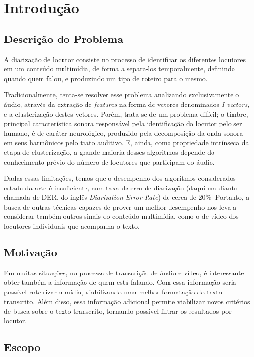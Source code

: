 \chapter{Introdução}

\section{Descrição do Problema}

A diarização de locutor consiste no processo de identificar os diferentes 
locutores em um conteúdo multimídia, de forma a separa-los temporalmente, 
definindo quando quem falou, e produzindo um tipo de roteiro para o mesmo.

Tradicionalmente, tenta-se resolver esse problema analizando exclusivamente 
o áudio, através da extração de \textit{features} na forma de vetores 
denominados \textit{I-vectors}, e a clusterização destes vetores. Porém, 
trata-se de um problema difícil; o timbre, principal característica sonora 
responsável pela identificação do locutor pelo ser humano, é de caráter 
neurológico\cite{oxenhamPitchPerception2012}, produzido pela decomposição da
onda sonora em seus harmônicos pelo trato auditivo. E, ainda, como propriedade
intrínseca da etapa de clusterização, a grande maioria desses algoritmos 
depende do conhecimento prévio do número de locutores que participam do áudio. 

Dadas essas limitações, temos que o desempenho dos algoritmos considerados 
estado da arte é insuficiente, com taxa de erro de diarização (daqui em diante 
chamada de DER, do inglês \textit{Diarization Error Rate}) de cerca de 
20\%\cite{zewoudieUseLongtermFeatures2018}. Portanto, a busca de outras
técnicas capazes de prover um melhor desempenho nos leva a considerar também 
outros sinais do conteúdo multimídia, como o de vídeo dos locutores 
individuais que acompanha o texto.

\section{Motivação}

Em muitas situações, no processo de transcrição de áudio e vídeo, é 
interessante obter também a informação de quem está falando. Com essa 
informação seria possível roteirizar a mídia, viabilizando uma melhor 
formatação do texto transcrito. Além disso, essa informação adicional 
permite viabilizar novos critérios de busca sobre o texto transcrito, 
tornando possível filtrar os resultados por locutor.

\section{Escopo}